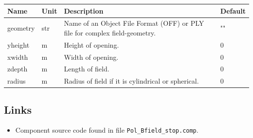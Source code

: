 \begin{longtable}{p{}p{}p{}p{}}
\toprule
\textbf{Name} & \textbf{Unit} & \textbf{Description} & \textbf{Default} \\
\midrule
\endhead
geometry & str & Name of an Object File Format (OFF) or PLY file for complex field-geometry. & "" \\
yheight & m & Height of opening. & 0 \\
xwidth & m & Width of opening. & 0 \\
zdepth & m & Length of field. & 0 \\
radius & m & Radius of field if it is cylindrical or spherical. & 0 \\
\bottomrule
\end{longtable}

\subsection*{Links}
\begin{itemize}
  \item Component source code found in file \texttt{Pol\_Bfield\_stop.comp}.
\end{itemize}
